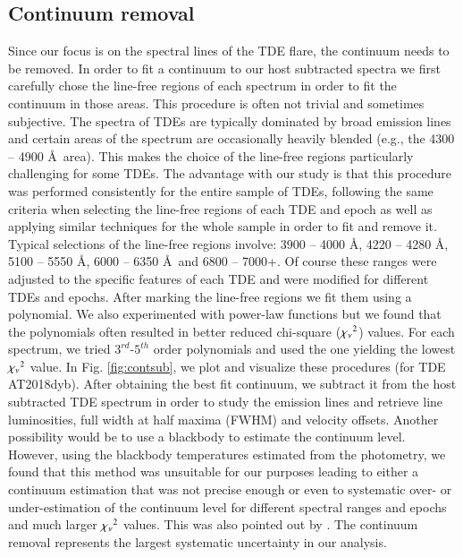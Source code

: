 \documentclass[structabstract]{aa}
\begin{document}
\subsection{Continuum removal} \label{subsub:cs}
Since our focus is on the spectral lines of the TDE flare, the continuum needs to be removed. In order to fit a continuum to our host subtracted spectra we first carefully chose the line-free regions of each spectrum in order to fit the continuum in those areas. This procedure is often not trivial and sometimes subjective. The spectra of TDEs are typically dominated by broad emission lines and certain areas of the spectrum are occasionally heavily blended (e.g., the 4300 -- 4900 \AA\, area). This makes the choice of the line-free regions particularly challenging for some TDEs. The advantage with our study is that this procedure was performed consistently for the entire sample of TDEs, following the same criteria when selecting the line-free regions of each TDE and epoch as well as applying similar techniques for the whole sample in order to fit and remove it. Typical selections of the line-free regions involve: 3900 -- 4000 \AA, 4220 -- 4280 \AA, 5100 -- 5550 \AA, 6000 -- 6350 \AA\, and 6800 -- 7000+. Of course these ranges were adjusted to the specific features of each TDE and were modified for different TDEs and epochs. After marking the line-free regions we
fit them using a polynomial. 
We also experimented with power-law functions but we found that the polynomials often resulted in better reduced chi-square (${\rm \chi_{\rm \nu}}^{2}$) values. For each spectrum, we tried $3^{rd}$-$5^{th}$ order polynomials and used the one yielding the lowest ${\rm \chi_{\rm \nu}}^{2}$ value. In Fig. \ref{fig:contsub}, we plot and visualize these procedures (for TDE AT2018dyb). After obtaining the best fit continuum, we subtract it from the host subtracted TDE spectrum in order to study the emission lines and retrieve line luminosities, full width at half maxima (FWHM) and velocity offsets. Another possibility would be to use a blackbody to estimate the continuum level. However, using the blackbody temperatures estimated from the photometry, we found that this method was unsuitable for our purposes leading to either a continuum estimation that was not precise enough or even to systematic over- or under-estimation of the continuum level for different spectral ranges and epochs and much larger ${\rm \chi_{\rm \nu}}^{2}$ values. This was also pointed out by \citealt{Hung2019}. The continuum removal represents the largest systematic uncertainty in our analysis.
\end{document}
